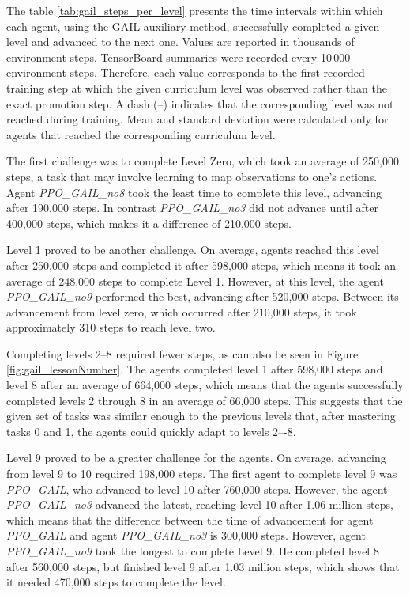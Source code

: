 The table \ref{tab:gail_steps_per_level} presents the time intervals within which each agent, using the GAIL auxiliary method, successfully completed a given level and advanced to the next one. Values are reported in thousands of environment steps. TensorBoard summaries were recorded every 10\,000 environment steps. Therefore, each value corresponds to the first recorded training step at which the given curriculum level was observed rather than the exact promotion step. A dash (--) indicates that the corresponding level was not reached during training. Mean and standard deviation were calculated only for agents that reached the corresponding curriculum level.

The first challenge was to complete Level Zero, which took an average of 250,000 steps, a task that may involve learning to map observations to one’s actions.
Agent \textit{PPO\_GAIL\_no8} took the least time to complete this level, advancing after 190,000 steps. In contrast \textit{PPO\_GAIL\_no3} did not advance until after 400,000 steps, which makes it a difference of 210,000 steps.

Level 1 proved to be another challenge. On average, agents reached this level after 250,000 steps and completed it after 598,000 steps, which means it took an average of 248,000 steps to complete Level 1. However, at this level, the agent \textit{PPO\_GAIL\_no9} performed the best, advancing after 520,000 steps. Between its advancement from level zero, which occurred after 210,000 steps, it took approximately 310 steps to reach level two.

Completing levels 2–8 required fewer steps, as can also be seen in Figure \ref{fig:gail_lessonNumber}. The agents completed level 1 after 598,000 steps and level 8 after an average of 664,000 steps, which means that the agents successfully completed levels 2 through 8 in an average of 66,000 steps. This suggests that the given set of tasks was similar enough to the previous levels that, after mastering tasks 0 and 1, the agents could quickly adapt to levels 2–-8.

Level 9 proved to be a greater challenge for the agents. On average, advancing from level 9 to 10 required 198,000 steps. The first agent to complete level 9 was \textit{PPO\_GAIL}, who advanced to level 10 after 760,000 steps. However, the agent \textit{PPO\_GAIL\_no3} advanced the latest, reaching level 10 after 1.06 million steps, which means that the difference between the time of advancement for agent \textit{PPO\_GAIL} and agent \textit{PPO\_GAIL\_no3} is 300,000 steps. However, agent \textit{PPO\_GAIL\_no9} took the longest to complete Level 9. He completed level 8 after 560,000 steps, but finished level 9 after 1.03 million steps, which shows that it needed 470,000 steps to complete the level.

